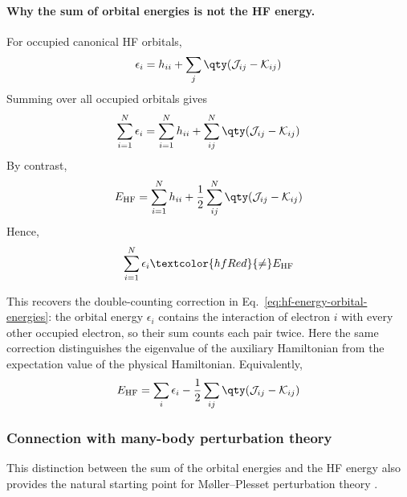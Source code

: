 \documentclass[11pt,a4paper,titlepage]{article}
\numberwithin{equation}{section}
\newcommand{\cJ}{\mathcal{J}}
\newcommand{\cK}{\mathcal{K}}
\newcommand{\red}[1]{\textcolor{hfRed}{#1}}
\begin{document}
\paragraph{Why the sum of orbital energies is not the HF energy.}

For occupied canonical HF orbitals,
\begin{equation}
  \epsilon_i
  =
  h_{ii}
  +
  \sum_j
  \qty(
    \cJ_{ij}-\cK_{ij}
  )
\end{equation}
Summing over all occupied orbitals gives
\begin{equation}
  \sum_{i=1}^{N}\epsilon_i
  =
  \sum_{i=1}^{N}h_{ii}
  +
  \sum_{ij}^{N}
  \qty(
    \cJ_{ij}-\cK_{ij}
  )
\end{equation}
By contrast,
\begin{equation}
  E_\text{HF}
  =
  \sum_{i=1}^{N}h_{ii}
  +
  \frac{1}{2}
  \sum_{ij}^{N}
  \qty(
    \cJ_{ij}-\cK_{ij}
  )
\end{equation}
Hence,
\begin{equation}
  \sum_{i=1}^{N}\epsilon_i
  \red{\neq}
  E_\text{HF}
\end{equation}

This recovers the double-counting correction in
Eq.~\eqref{eq:hf-energy-orbital-energies}: the orbital energy $\epsilon_i$
contains the interaction of electron $i$ with every other occupied electron,
so their sum counts each pair twice. Here the same correction distinguishes
the eigenvalue of the auxiliary Hamiltonian from the expectation value of the
physical Hamiltonian.
Equivalently,
\begin{equation}
  E_\text{HF}
  =
  \sum_i\epsilon_i
  -
  \frac{1}{2}
  \sum_{ij}
  \qty(
    \cJ_{ij}-\cK_{ij}
  )
  \label{eq:hf-energy-vs-orbital-sum}
\end{equation}


\subsubsection{Connection with many-body perturbation theory}
\label{sec:mp2-connection}

This distinction between the sum of the orbital energies and the HF energy
also provides the natural starting point for
\red{M{\o}ller--Plesset perturbation theory} \citep{MollerPlesset1934,Cremer2011}.
\end{document}
